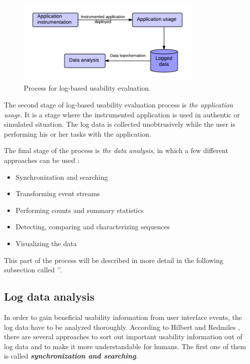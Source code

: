 \documentclass[12pt,a4paper,oneside,pdftex]{report}
\begin{document}
\begin{figure}[H]
  	\centering
  	\includegraphics[width=0.8\textwidth]{./images/logging_usability_process.png}
  	\caption{Process for log-based usability evaluation. \cite{RefWorks:24}}
	\label{fig:logging_usability_process}
\end{figure}

The second stage of log-based usability evaluation process is \emph{the application usage}. It is a stage where the instrumented application is used in authentic or simulated situation. The log data is collected unobtrusively while the user is performing his or her tasks with the application. \cite{RefWorks:24}

The final stage of the process is \emph{the data analysis}, in which a few different approaches can be used \cite{RefWorks:24, RefWorks:25}:
\begin{itemize}
  \item Synchronization and searching
  \item Transforming event streams
  \item Performing counts and summary statistics
  \item Detecting, comparing and characterizing sequences 
  \item Visualizing the data
\end{itemize}
This part of the process will be described in more detail in the following subsection called ''.

\subsection{Log data analysis}
\label{sec:analysis}
In order to gain beneficial usability information from user interface events, the log data have to be analyzed thoroughly. According to  Hilbert and Redmiles \cite{RefWorks:25}, there are several approaches to sort out important usability information out of log data and to make it more understandable for humans.
The first one of them is called \textbf{\emph{synchronization and searching}}. 
\end{document}
